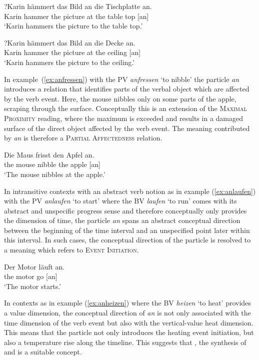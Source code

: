 \documentclass[output=paper]{langsci/langscibook}
\begin{document}
\ea\label{ex:anhaemmernTischplatte}
\gll ?Karin hämmert das Bild an die Tischplatte an.\\
Karin hammer the picture at the {table top} [an]\\
\glt `Karin hammers the picture to the table top.'
\z

\ea\label{ex:anhaemmernDecke}
\gll ?Karin hämmert das Bild an die Decke an.\\
Karin hammer the picture at the ceiling [an]\\
\glt `Karin hammers the picture to the ceiling.'
\z

In example~(\ref{ex:anfressen}) with the PV \textit{anfressen} `to
nibble' the particle \textit{an} introduces a relation that
identifies parts of the verbal object which are affected by the verb
event. Here, the mouse nibbles only on some parts of the apple,
scraping through the surface. Conceptually this is an extension of the
\textsc{Maximal Proximity} reading, where the maximum is exceeded and
results in a damaged surface of the direct object affected by the verb
event. The meaning contributed by \textit{an} is therefore a
\textsc{Partial Affectedness} relation.

\ea\label{ex:anfressen}
\gll Die Maus frisst den Apfel an.\\
the mouse nibble the apple [an]\\
\glt `The mouse nibbles at the apple.'
\z

In intransitive contexts with an abstract verb notion as in example
(\ref{ex:anlaufen}) with the PV \textit{anlaufen} `to start' where
the BV \textit{laufen} `to run' comes with its abstract and
unspecific progress sense and therefore conceptually only provides the
dimension of time, the particle \textit{an} spans an abstract
conceptual direction between the beginning of the time interval and an
unspecified point later within this interval. In such cases, the
conceptual direction of the particle is resolved to a meaning which
refers to \textsc{Event Initiation}.

\ea\label{ex:anlaufen}
\gll Der Motor läuft an.\\
the motor go [an]\\
\glt `The motor starts.'
\z

In contexts as in example (\ref{ex:anheizen}) where the BV
\textit{heizen} `to heat' provides a value dimension, the conceptual
direction of \textit{an} is not only associated with the time
dimension of the verb event but also with the vertical-value heat
dimension. This means that the particle not only introduces the
heating event initiation, but also a temperature rise along the
timeline. This suggests that , the synthesis of
 and  is a suitable concept.
\end{document}
